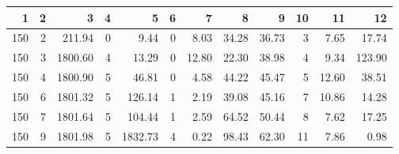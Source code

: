 \begin{tabular}{rrrrrrrrrrrr}
\toprule
1 & 2 & 3 & 4 & 5 & 6 & 7 & 8 & 9 & 10 & 11 & 12 \\
\midrule
150 & 2 & 211.94 & 0 & 9.44 & 0 & 8.03 & 34.28 & 36.73 & 3 & 7.65 & 17.74 \\
150 & 3 & 1800.60 & 4 & 13.29 & 0 & 12.80 & 22.30 & 38.98 & 4 & 9.34 & 123.90 \\
150 & 4 & 1800.90 & 5 & 46.81 & 0 & 4.58 & 44.22 & 45.47 & 5 & 12.60 & 38.51 \\
150 & 6 & 1801.32 & 5 & 126.14 & 1 & 2.19 & 39.08 & 45.16 & 7 & 10.86 & 14.28 \\
150 & 7 & 1801.64 & 5 & 104.44 & 1 & 2.59 & 64.52 & 50.44 & 8 & 7.62 & 17.25 \\
150 & 9 & 1801.98 & 5 & 1832.73 & 4 & 0.22 & 98.43 & 62.30 & 11 & 7.86 & 0.98 \\
\bottomrule
\end{tabular}
